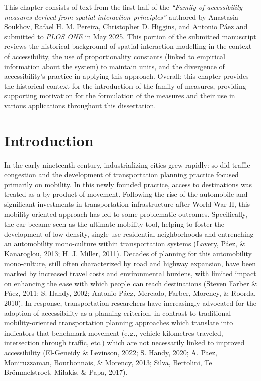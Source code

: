 \documentclass[
11pt, %
oneside, %
english, %
singlespacing, %
]{macthesis} %
\begin{document}
This chapter consists of text from the first half of the \emph{``Family of accessibility measures derived from spatial interaction principles''} authored by Anastasia Soukhov, Rafael H. M. Pereira, Christopher D. Higgins, and Antonio Páez and submitted to \emph{PLOS ONE} in May 2025. This portion of the submitted manuscript reviews the historical background of spatial interaction modelling in the context of accessibility, the use of proportionality constants (linked to empirical information about the system) to maintain units, and the divergence of accessibility's practice in applying this approach. Overall: this chapter provides the historical context for the introduction of the family of measures, providing supporting motivation for the formulation of the measures and their use in various applications throughout this dissertation.

\section{Introduction}\label{introduction-1}

In the early nineteenth century, industrializing cities grew rapidly: so did traffic congestion and the development of transportation planning practice focused primarily on mobility. In this newly founded practice, access to destinations was treated as a by-product of movement. Following the rise of the automobile and significant investments in transportation infrastructure after World War II, this mobility-oriented approach has led to some problematic outcomes. Specifically, the car became seen as the ultimate mobility tool, helping to foster the development of low-density, single-use residential neighborhoods and entrenching an automobility mono-culture within transportation systems (Lavery, Páez, \& Kanaroglou, 2013; H. J. Miller, 2011). Decades of planning for this automobility mono-culture, still often characterized by road and highway expansion, have been marked by increased travel costs and environmental burdens, with limited impact on enhancing the ease with which people can reach destinations (Steven Farber \& Páez, 2011; S. Handy, 2002; Antonio Páez, Mercado, Farber, Morency, \& Roorda, 2010). In response, transportation researchers have increasingly advocated for the adoption of accessibility as a planning criterion, in contrast to traditional mobility-oriented transportation planning approaches which translate into indicators that benchmark movement (e.g., vehicle kilometres traveled, intersection through traffic, etc.) which are not necessarily linked to improved accessibility (El-Geneidy \& Levinson, 2022; S. Handy, 2020; A. Paez, Moniruzzaman, Bourbonnais, \& Morency, 2013; Silva, Bertolini, Te Brömmelstroet, Milakis, \& Papa, 2017).
\end{document}
